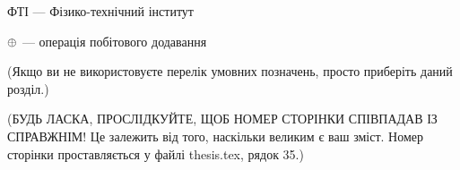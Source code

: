 ФТІ --- Фізико-технічний інститут

$\oplus$ --- операція побітового додавання  %

(Якщо ви не використовуєте перелік умовних позначень, просто приберіть
даний розділ.)

(БУДЬ ЛАСКА, ПРОСЛІДКУЙТЕ, ЩОБ НОМЕР СТОРІНКИ СПІВПАДАВ ІЗ СПРАВЖНІМ! Це залежить від того, наскільки великим є ваш зміст.
Номер сторінки проставляється у файлі thesis.tex, рядок 35.)